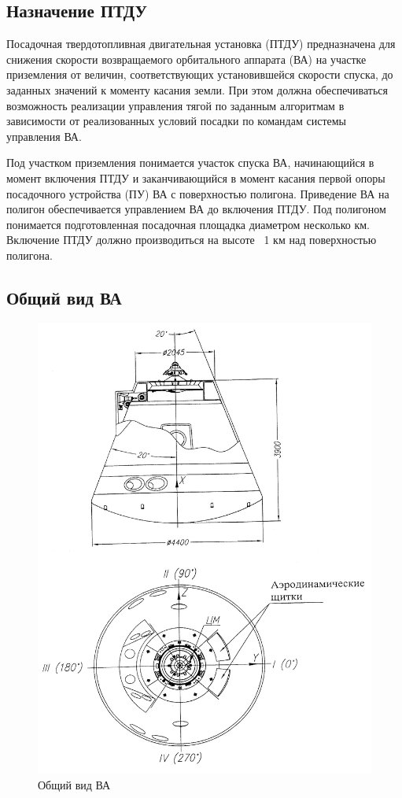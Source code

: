 \subsection{Назначение ПТДУ}
Посадочная твердотопливная двигательная установка (ПТДУ) предназначена для снижения скорости возвращаемого орбитального аппарата (ВА) на участке приземления от величин, соответствующих установившейся скорости спуска, до заданных значений к моменту касания земли. При этом должна обеспечиваться возможность реализации управления тягой по заданным алгоритмам в зависимости от реализованных условий посадки по командам системы управления ВА.	

Под участком приземления понимается участок спуска ВА, начинающийся в момент включения ПТДУ и заканчивающийся в момент касания первой опоры посадочного устройства (ПУ) ВА с поверхностью полигона. Приведение ВА на полигон обеспечивается управлением ВА до включения ПТДУ. Под полигоном понимается подготовленная посадочная площадка диаметром несколько км. Включение ПТДУ должно производиться на высоте ~1 км над поверхностью полигона.
\clearpage

\subsection{Общий вид ВА}
\begin{figure}[h]
	\centering
	\includegraphics[scale=0.7]{images/va.jpg}
	\caption{Общий вид ВА}
	\label{fig:va_pic}
\end{figure}
\clearpage

